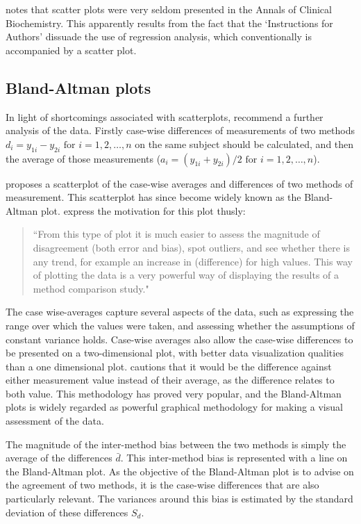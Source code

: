 \documentclass[12pt, a4paper]{report}
\begin{document}
	\citet{Dewitte} notes that scatter plots were very seldom
	presented in the Annals of Clinical Biochemistry. This apparently
	results from the fact that the `Instructions for Authors' dissuade
	the use of regression analysis, which conventionally is
	accompanied by a scatter plot.
	
	\newpage
	\subsection{Bland-Altman plots}
	
	In light of shortcomings associated with scatterplots,
	\citet*{BA83} recommend a further analysis of the data. Firstly
	case-wise differences of measurements of two methods $d_{i} =
	y_{1i}-y_{2i} \mbox{ for }i=1,2,\dots,n$ on the same subject
	should be calculated, and then the average of those measurements
	($a_{i} = (y_{1i} + y_{2i})/2 \mbox{ for }i=1,2,\dots, n$).
	
	\citet{BA83} proposes a scatterplot of the case-wise averages and differences of two methods of measurement. This scatterplot has since become widely known as the Bland-Altman plot. \citet*{BA83} express the
	motivation for this plot thusly:
	\begin{quote}
		``From this type of plot it is much easier to assess the magnitude
		of disagreement (both error and bias), spot outliers, and see
		whether there is any trend, for example an increase in (difference) for high values. This way of plotting the data is a very powerful way of displaying the results of a method comparison study."
	\end{quote}
	
	The case wise-averages capture several aspects of the data, such as expressing the range over which the values were taken, and assessing whether the assumptions of constant variance holds.
	Case-wise averages also allow the case-wise differences to be presented on a two-dimensional plot, with better data visualization qualities than a one dimensional plot. \citet{BA86}
	cautions that it would be the difference against either measurement value instead of their average, as the difference relates to both value. This methodology has proved very popular, and the Bland-Altman plots is widely regarded as powerful graphical methodology for making a visual assessment of the data.
	
	The magnitude of the inter-method bias between the two methods is simply the average of the differences $\bar{d}$. This inter-method bias is represented with a line on the Bland-Altman plot. As the objective of the Bland-Altman plot is to advise on the agreement of two methods, it is the case-wise differences that are also particularly relevant. The variances around this bias is estimated by the standard deviation of these differences $S_{d}$.
	
\end{document}
